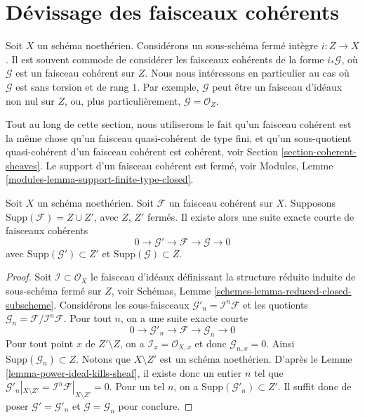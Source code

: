 \section{Dévissage des faisceaux cohérents}
\label{section-devissage}

\noindent
Soit $X$ un schéma noethérien. Considérons un sous-schéma fermé intègre
$i : Z \to X$. Il est souvent commode de considérer les faisceaux cohérents de
la forme $i_*\mathcal{G}$, où $\mathcal{G}$ est un faisceau cohérent sur
$Z$. Nous nous intéressons en particulier au cas où $\mathcal{G}$
est sans torsion et de rang $1$. Par exemple, $\mathcal{G}$ peut être
un faisceau d'idéaux non nul sur $Z$, ou, plus particulièrement,
$\mathcal{G} = \mathcal{O}_Z$.

\medskip\noindent
Tout au long de cette section, nous utiliserons le fait qu'un faisceau cohérent
est la même chose qu'un faisceau quasi-cohérent de type fini, et qu'un
sous-quotient quasi-cohérent d'un faisceau cohérent est cohérent, voir
Section \ref{section-coherent-sheaves}.
Le support d'un faisceau cohérent est fermé, voir
Modules, Lemme \ref{modules-lemma-support-finite-type-closed}.

\begin{lemma}
\label{lemma-prepare-filter-support}
Soit $X$ un schéma noethérien.
Soit $\mathcal{F}$ un faisceau cohérent sur $X$.
Supposons $\text{Supp}(\mathcal{F}) = Z \cup Z'$, avec $Z$, $Z'$ fermés.
Il existe alors une suite exacte courte de faisceaux cohérents
$$
0 \to \mathcal{G}' \to \mathcal{F} \to \mathcal{G} \to 0
$$
avec $\text{Supp}(\mathcal{G}') \subset Z'$ et
$\text{Supp}(\mathcal{G}) \subset Z$.
\end{lemma}

\begin{proof}
Soit $\mathcal{I} \subset \mathcal{O}_X$ le faisceau d'idéaux
définissant la structure réduite induite de sous-schéma fermé sur $Z$, voir
Schémas, Lemme \ref{schemes-lemma-reduced-closed-subscheme}.
Considérons les sous-faisceaux
$\mathcal{G}'_n = \mathcal{I}^n\mathcal{F}$ et les
quotients $\mathcal{G}_n = \mathcal{F}/\mathcal{I}^n\mathcal{F}$.
Pour tout $n$, on a une suite exacte courte
$$
0 \to \mathcal{G}'_n \to \mathcal{F} \to \mathcal{G}_n \to 0
$$
Pour tout point $x$ de $Z' \setminus Z$, on a
$\mathcal{I}_x = \mathcal{O}_{X, x}$
et donc $\mathcal{G}_{n, x} = 0$. Ainsi
$\text{Supp}(\mathcal{G}_n) \subset Z$. Notons que $X \setminus Z'$
est un schéma noethérien. D'après le Lemme \ref{lemma-power-ideal-kills-sheaf},
il existe donc un entier $n$ tel que
$\mathcal{G}'_n|_{X \setminus Z'} =
\mathcal{I}^n\mathcal{F}|_{X \setminus Z'} = 0$.
Pour un tel $n$, on a $\text{Supp}(\mathcal{G}'_n) \subset Z'$.
Il suffit donc de poser
$\mathcal{G}' = \mathcal{G}'_n$ et $\mathcal{G} = \mathcal{G}_n$
pour conclure.
\end{proof}

